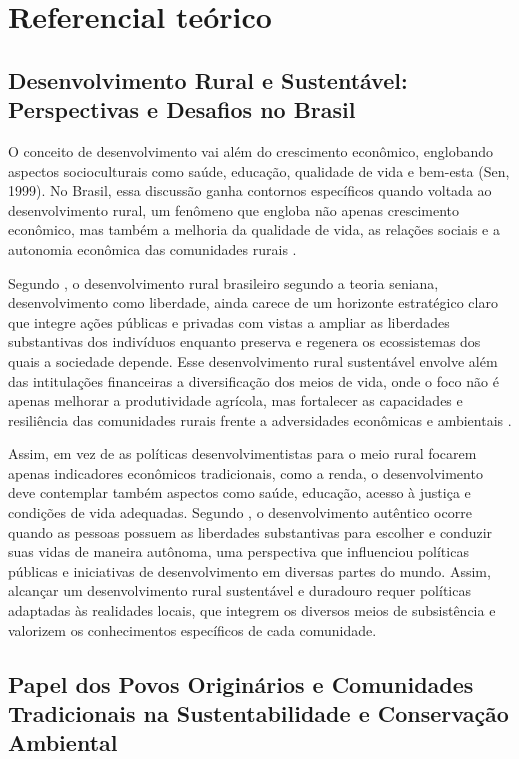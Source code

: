 \pagestyle{plain}


\chapter{Referencial teórico}


\section{Desenvolvimento Rural e Sustentável: Perspectivas e Desafios no Brasil}


O conceito de desenvolvimento vai além do crescimento econômico, englobando aspectos socioculturais como saúde, educação, qualidade de vida e bem-esta (Sen, 1999). No Brasil, essa discussão ganha contornos específicos quando voltada ao desenvolvimento rural, um fenômeno que engloba não apenas crescimento econômico, mas também a melhoria da qualidade de vida, as relações sociais e a autonomia econômica das comunidades rurais \cite{Navarro2001}. 

Segundo , o desenvolvimento rural brasileiro segundo a teoria seniana, desenvolvimento como liberdade, ainda carece de um horizonte estratégico claro que integre ações públicas e privadas com vistas a ampliar as liberdades substantivas dos indivíduos enquanto preserva e regenera os ecossistemas dos quais a sociedade depende. Esse desenvolvimento rural sustentável envolve além das intitulações financeiras  a diversificação dos meios de vida, onde o foco não é apenas melhorar a produtividade agrícola, mas fortalecer as capacidades e resiliência das comunidades rurais frente a adversidades econômicas e ambientais \cite{Perondi2012}. 

Assim, em vez de as políticas desenvolvimentistas para o meio rural focarem apenas indicadores econômicos tradicionais, como a renda, o desenvolvimento deve contemplar também aspectos como saúde, educação, acesso à justiça e condições de vida adequadas. Segundo , o desenvolvimento autêntico ocorre quando as pessoas possuem as liberdades substantivas para escolher e conduzir suas vidas de maneira autônoma, uma perspectiva que influenciou políticas públicas e iniciativas de desenvolvimento em diversas partes do mundo. Assim, alcançar um desenvolvimento rural sustentável e duradouro requer políticas adaptadas às realidades locais, que integrem os diversos meios de subsistência e valorizem os conhecimentos específicos de cada comunidade.


\section{Papel dos Povos Originários e Comunidades Tradicionais na Sustentabilidade e Conservação Ambiental}

